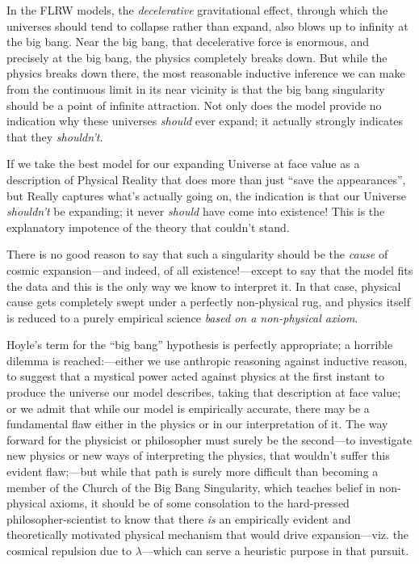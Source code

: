\documentclass[12 pt]{article}
\begin{document}
In the FLRW models, the \textit{decelerative} gravitational effect, through which the universes should tend to collapse rather than expand, also blows up to infinity at the big bang. Near the big bang, that decelerative force is enormous, and precisely at the big bang, the physics completely breaks down. But while the physics breaks down there, the most reasonable inductive inference we can make from the continuous limit in its near vicinity is that the big bang singularity should be a point of infinite attraction. Not only does the model provide no indication why these universes \textit{should} ever expand; it actually strongly indicates that they \textit{shouldn't}.

If we take the best model for our expanding Universe at face value as a description of Physical Reality that does more than just ``save the appearances'', but Really captures what's actually going on, the indication is that our Universe \textit{shouldn't} be expanding; it never \textit{should} have come into existence! This is the explanatory impotence of the theory that \citet{Eddington1933} couldn't stand.

There is no good reason to say that such a singularity should be the \textit{cause} of cosmic expansion---and indeed, of all existence!---except to say that the model fits the data and this is the only way we know to interpret it. In that case, physical cause gets completely swept under a perfectly non-physical rug, and physics itself is reduced to a purely empirical science \textit{based on a non-physical axiom}. 

Hoyle's term for the ``big bang'' hypothesis is perfectly appropriate; a horrible dilemma is reached:---either we use anthropic reasoning against inductive reason, to suggest that a mystical power acted against physics at the first instant to produce the universe our model describes, taking that description at face value; or we admit that while our model is empirically accurate, there may be a fundamental flaw either in the physics or in our interpretation of it. The way forward for the physicist or philosopher must surely be the second---to investigate new physics or new ways of interpreting the physics, that wouldn't suffer this evident flaw;---but while that path is surely more difficult than becoming a member of the Church of the Big Bang Singularity, which teaches belief in non-physical axioms, it should be of some consolation to the hard-pressed philosopher-scientist to know that there \textit{is} an empirically evident and theoretically motivated physical mechanism that would drive expansion---viz. the cosmical repulsion due to $\lambda$---which can serve a heuristic purpose in that pursuit.
\end{document}
